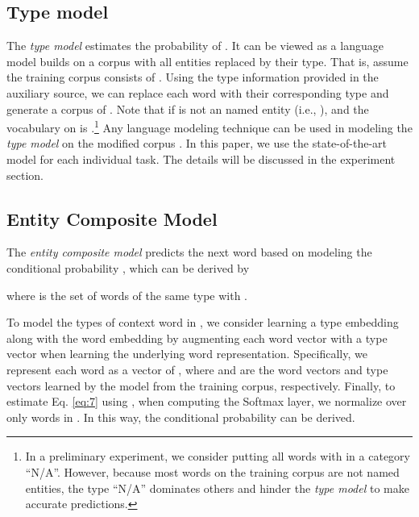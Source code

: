 \documentclass[11pt,a4paper]{article}
\begin{document}
\subsection{ Type model}
\label{type model}

The \textit{ type model}  estimates the probability of . It can be viewed as a language model builds on a corpus with all entities replaced by their type. That is, assume the training corpus consists of . Using the type information provided in the auxiliary source, we can replace each word  with their corresponding type  and generate a corpus of . Note that if  is not an named entity (i.e., ),  and the vocabulary  on  is .\footnote{In a preliminary experiment, we consider putting all words with  in a category ``N/A''. However, because most words on the training corpus are not named entities, the type ``N/A'' dominates others and hinder the \textit{ type model} to make accurate predictions. } Any language modeling technique can be used in modeling the \textit{ type model} on the modified corpus . In this paper, we use the state-of-the-art model for each individual task. The details will be discussed in the experiment section. 














\subsection{Entity Composite Model}
\label{entity composite model}

The {\it entity composite model} predicts the next word based on modeling the conditional probability 
, which can be derived by

where  is the set of words of the same type with .

To model the types of context word  in , we consider learning a type embedding along with the word embedding by augmenting each word vector with a type vector when learning the underlying word representation. Specifically, we represent each word  as a vector of , where  and  are the word vectors and type vectors learned by the model from the training corpus, respectively. 
Finally, to estimate Eq. \eqref{eq:7} using , when computing the Softmax layer, we normalize over only words in . In this way, the conditional probability 
 can be derived. 
\end{document}
